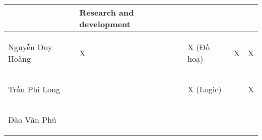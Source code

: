\documentclass{article}
\begin{document}
\begin{flushleft}
\begin{tabular}{|>{\raggedright\arraybackslash}p{3cm}| >{\raggedright\arraybackslash}p{3cm}|
>{\raggedright\arraybackslash}p{3cm}|
>{\raggedright\arraybackslash}p{3cm}|
>{\raggedright\arraybackslash}p{3cm}|}
        &Research and development
        \\
    \hline
        \begin{center}
            Nguyễn Duy Hoàng
        \end{center} & \begin{center}
            X
        \end{center} & \begin{center}
            X (Đồ hoạ)
        \end{center} & \begin{center}
            X
        \end{center} & \begin{center}
            X
        \end{center}
        \\
    \hline
        \begin{center}
            Trần Phi Long
        \end{center} & \begin{center}
            
        \end{center} & \begin{center}
            X (Logic)
        \end{center} & \begin{center}
        
        \end{center} & \begin{center}
            X
        \end{center}
        \\
    \hline
     \begin{center}
            Đào Văn Phú
        \end{center} & \begin{center}
            
        \end{center} & \begin{center}
            

\end{center}
\end{tabular}
\end{flushleft}
\end{document}
